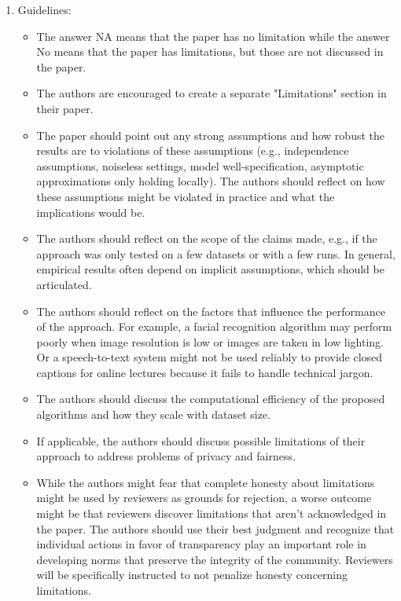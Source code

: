 \documentclass{article}
\theoremstyle{plain}
\theoremstyle{definition}
\theoremstyle{remark}
\begin{document}
\begin{enumerate}
    \item[] Guidelines:
    \begin{itemize}
        \item The answer NA means that the paper has no limitation while the answer No means that the paper has limitations, but those are not discussed in the paper. 
        \item The authors are encouraged to create a separate "Limitations" section in their paper.
        \item The paper should point out any strong assumptions and how robust the results are to violations of these assumptions (e.g., independence assumptions, noiseless settings, model well-specification, asymptotic approximations only holding locally). The authors should reflect on how these assumptions might be violated in practice and what the implications would be.
        \item The authors should reflect on the scope of the claims made, e.g., if the approach was only tested on a few datasets or with a few runs. In general, empirical results often depend on implicit assumptions, which should be articulated.
        \item The authors should reflect on the factors that influence the performance of the approach. For example, a facial recognition algorithm may perform poorly when image resolution is low or images are taken in low lighting. Or a speech-to-text system might not be used reliably to provide closed captions for online lectures because it fails to handle technical jargon.
        \item The authors should discuss the computational efficiency of the proposed algorithms and how they scale with dataset size.
        \item If applicable, the authors should discuss possible limitations of their approach to address problems of privacy and fairness.
        \item While the authors might fear that complete honesty about limitations might be used by reviewers as grounds for rejection, a worse outcome might be that reviewers discover limitations that aren't acknowledged in the paper. The authors should use their best judgment and recognize that individual actions in favor of transparency play an important role in developing norms that preserve the integrity of the community. Reviewers will be specifically instructed to not penalize honesty concerning limitations.
    \end{itemize}


\end{enumerate}
\end{document}
